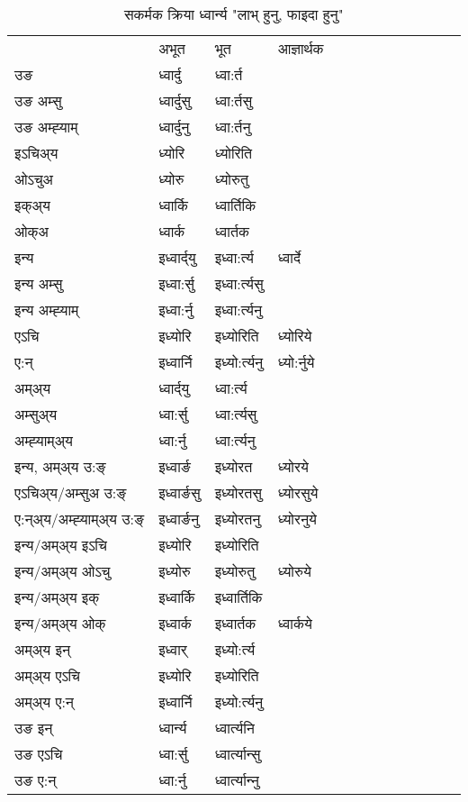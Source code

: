 \begin{table}[H]
\label{ort.vt} \centering
\caption{सकर्मक क्रिया  ध्वार्न्य  "लाभ् हुनु, फाइदा हुनु"  }
\begin{tabular}{l|l|l|l|l|l|l|l|l|l|l|l|l}  \toprule
&अभूत & भूत & आज्ञार्थक \\ 
उङ &ध्वार्दु &ध्वा:र्त \\ 
उङ अम्सु&ध्वार्दुसु &ध्वा:र्तसु \\ 
उङ अम्ह्‍याम्&ध्वार्दुनु &ध्वा:र्तनु \\ 
इऽचिअ्य &ध्योरि &ध्योरिति   \\ 
ओऽचुअ        &ध्योरु &ध्योरुतु   \\ 
इक्अ्य&ध्वार्कि &ध्वार्तिकि   \\ 
ओक्अ &ध्वार्क &ध्वार्तक   \\ 
इन्य & इध्वार्द्‌यु  & इध्वा:र्त्य &ध्वार्दे  \\ 
इन्य अम्सु& इध्वा:र्सु  & इध्वा:र्त्यसु   \\ 
इन्य अम्ह्‍याम्& इध्वा:र्नु  & इध्वा:र्त्यनु   \\ 
एऽचि & इध्योरि & इध्योरिति &ध्योरिये    \\ 
ए:न् & इध्वार्नि  & इध्यो:र्त्यनु &ध्यो:र्नुये  \\ 
अम्अ्य & ध्वार्द्‌यु  & ध्वा:र्त्य  \\ 
अम्सुअ्य & ध्वा:र्सु & ध्वा:र्त्यसु  \\ 
अम्ह्‍याम्अ्य & ध्वा:र्नु  & ध्वा:र्त्यनु \\ 
\midrule
इन्य, अम्अ्य उ:ङ्‌ &इध्वार्ङ &इध्योरत &ध्योरये \\ 
एऽचिअ्य/अम्सुअ उ:ङ्‌ &इध्वार्ङसु &इध्योरतसु &ध्योरसुये \\ 
ए:न्अ्य/अम्ह्‍याम्अ्य उ:ङ्‌ &इध्वार्ङनु &इध्योरतनु &ध्योरनुये \\ 
इन्य/अम्अ्य इऽचि &इध्योरि &इध्योरिति    \\ 
इन्य/अम्अ्य ओऽचु &इध्योरु &इध्योरुतु  &ध्योरुये  \\ 
इन्य/अम्अ्य इक् &इध्वार्कि &इध्वार्तिकि   \\ 
इन्य/अम्अ्य ओक् &इध्वार्क &इध्वार्तक  &ध्वार्कये  \\ 
अम्अ्य इन् & इध्वार् & इध्यो:र्त्य   \\ 
अम्अ्य एऽचि & इध्योरि & इध्योरिति    \\ 
अम्अ्य ए:न् & इध्वार्नि  & इध्यो:र्त्यनु  \\ 
\midrule
उङ इन् & ध्वार्न्य  & ध्वार्त्यनि  \\ 
उङ एऽचि & ध्वा:र्सु  & ध्वार्त्यान्सु   \\ 
उङ ए:न्& ध्वा:र्नु  & ध्वार्त्यान्‍नु   \\ 
\bottomrule
\end{tabular}
\end{table}


